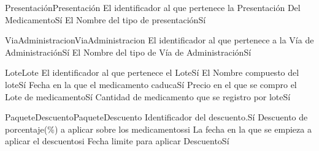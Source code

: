 \begin{cdtEntidad}{Presentación}{Presentación}
		{El identificador al que pertenece la Presentación Del Medicamento}{Sí}
		{El Nombre del tipo de presentación}{Sí}

\end{cdtEntidad}

\begin{cdtEntidad}{ViaAdministracion}{ViaAdministracion}
		{El identificador al que pertenece a la Vía de Administración}{Sí}
		{El Nombre del tipo de Vía de Administración}{Sí}

\end{cdtEntidad}

\begin{cdtEntidad}{Lote}{Lote}
		{El identificador al que pertenece el Lote}{Sí}
		{El Nombre compuesto del lote}{Sí}
		{Fecha en la que el medicamento caduca}{Sí}
		{Precio en el que se compro el Lote de medicamento}{Sí}
		{Cantidad de medicamento que se registro por lote}{Sí}
\end{cdtEntidad}

\begin{cdtEntidad}{PaqueteDescuento}{PaqueteDescuento}
		{Identificador del descuento.}{Sí}
		{Descuento de porcentaje(\%) a aplicar sobre los medicamentos}{si}
		{La fecha en la que se empieza a aplicar el descuento}{si}
		{Fecha limite para aplicar Descuento}{Sí}
\end{cdtEntidad}

